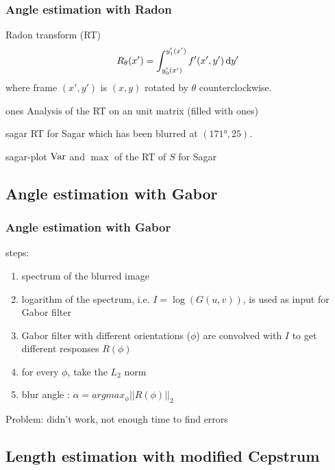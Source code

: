 \begin{frame}[allowframebreaks]
  \frametitle{Angle estimation with Radon}
  \begin{block}{Radon transform (RT)}
    \[ R_\theta(x') = \int_{y_0'(x')}^{y_1'(x')} f'(x',y') \operatorname{d}\! y' \]
    where frame $(x',y')$ is $(x,y)$ rotated by $\theta$ counterclockwise.
  \end{block}

  \begin{myfig}{ones}
    {Analysis of the RT on an unit matrix (filled with ones)}
  \end{myfig}

  \begin{myfig}{sagar}
    {RT for Sagar which has been blurred at $(\ang{171}, 25)$.}
  \end{myfig}

  \begin{myfig}{sagar-plot}
    {$\operatorname{Var}$ and $\max$ of the RT of $S$ for Sagar}
  \end{myfig}
\end{frame}

\subsection{Angle estimation with Gabor}
\begin{frame}
	\frametitle{Angle estimation with Gabor}
	steps:
	\begin{enumerate}
	\item spectrum of the blurred image
	\item logarithm of the spectrum, i.e. $I=\log(G(u,v))$, is used as input for Gabor filter
	\item Gabor filter with different orientations ($\phi$) are convolved with $I$ to get different responses $R(\phi)$
	\item for every $\phi$, take the $L_2$ norm
	\item blur angle : $\alpha = arg{max_{\phi}||R(\phi)||_2}$
	\end{enumerate}
	
	Problem: didn't work, not enough time to find errors
\end{frame}


\subsection{Length estimation with modified Cepstrum}
